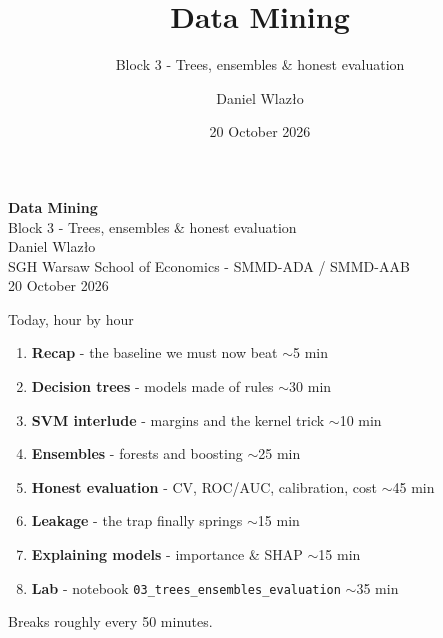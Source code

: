 \documentclass[10pt,aspectratio=169]{beamer}
\title[Data Mining]{Data Mining}
\subtitle{Block 3 - Trees, ensembles \& honest evaluation}
\author{Daniel Wlazło}
\institute{SGH Warsaw School of Economics - SMMD-ADA / SMMD-AAB}
\date{20 October 2026}
\begin{document}
\begin{frame}[plain]
  \begin{center}
    \vspace{1cm}
    {\LARGE\textbf{Data Mining}}\\[0.5cm]
    {\large Block 3 - Trees, ensembles \& honest evaluation}\\[1.5cm]
    {\large Daniel Wlazło} \\[0.2cm]
    {\small SGH Warsaw School of Economics - SMMD-ADA / SMMD-AAB} \\[0.2cm]
    {\small 20 October 2026}
  \end{center}
\end{frame}

\begin{frame}{Today, hour by hour}
  \begin{enumerate}
    \item \textbf{Recap} - the baseline we must now beat \hfill {\small$\sim$5 min}
    \item \textbf{Decision trees} - models made of rules \hfill {\small$\sim$30 min}
    \item \textbf{SVM interlude} - margins and the kernel trick \hfill {\small$\sim$10 min}
    \item \textbf{Ensembles} - forests and boosting \hfill {\small$\sim$25 min}
    \item \textbf{Honest evaluation} - CV, ROC/AUC, calibration, cost \hfill {\small$\sim$45 min}
    \item \textbf{Leakage} - the trap finally springs \hfill {\small$\sim$15 min}
    \item \textbf{Explaining models} - importance \& SHAP \hfill {\small$\sim$15 min}
    \item \textbf{Lab} - notebook \texttt{03\_trees\_ensembles\_evaluation} \hfill {\small$\sim$35 min}
  \end{enumerate}
  \vspace{0.4em}
  \begin{center}\small Breaks roughly every 50 minutes.\end{center}
\end{frame}
\end{document}
